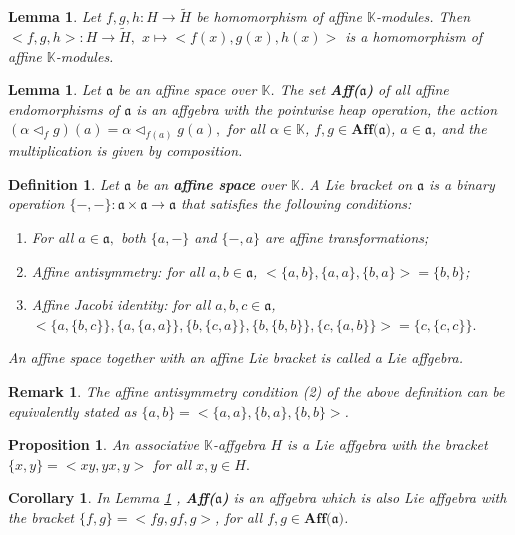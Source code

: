 \documentclass{article}
\newtheorem{remark}{Remark}[section]
\newtheorem{definition}{Definition}[section]
\newtheorem{corollary}{Corollary}[theorem]
\newtheorem{lemma}[theorem]{Lemma}
\newtheorem{proposition}[theorem]{Proposition}
\theoremstyle{definition}
\theoremstyle{remark}
\theoremstyle{plain}
\begin{document}
\begin{lemma}\cite{Brz1}
    Let $f, g, h: H\rightarrow \widetilde{H}$ be homomorphism of affine $\mathbb{K}$-modules. Then $<f, g, h>: H\rightarrow \widetilde{H},$ $x\mapsto <f(x), g(x), h(x)>$ is a homomorphism of affine $\mathbb{K}$-modules.
\end{lemma}
\begin{lemma}\label{0}\cite{Brz1}
     Let $\mathfrak{a}$ be an affine space over $\mathbb{K}$. The set \textbf{Aff($\mathfrak{a}$)} of all affine endomorphisms of $\mathfrak{a}$ is an affgebra with the pointwise heap operation, the action $(\alpha \triangleleft_{f}g)(a)=\alpha \triangleleft_{f(a)}g(a),$ for all $\alpha \in \mathbb{K}$, $f, g \in \textbf{Aff($\mathfrak{a}$)}$, $a\in \mathfrak{a}$, and the multiplication is given by composition.
\end{lemma}

\begin{definition} \cite{And2}
     Let $\mathfrak{a}$ be an \textbf{affine space} over $\mathbb{K}$. A \emph{Lie bracket} on $\mathfrak{a}$ is a binary operation $\{-,-\}:\mathfrak{a} \times \mathfrak{a} \rightarrow \mathfrak{a}$ that satisfies the following conditions:
     \begin{enumerate}
         \item For all $a\in \mathfrak{a},$ both $\{a, -\}$ and $\{-, a\}$ are affine transformations;
         \item Affine antisymmetry: for all $a, b \in \mathfrak{a}$, $<\{a, b\}, \{a, a\}, \{b, a\}>=\{b, b\}$;
         \item Affine Jacobi identity: for all $a, b, c \in \mathfrak{a}$, $<\{a, \{b, c\}\}, \{a, \{a, a\}\}, \{b, \{c,a\}\}, \{b, \{b, b\}\}, \{c, \{a, b\}\}>=\{c, \{c, c\}\}.$
     \end{enumerate}
     An affine space together with an affine Lie bracket is called a Lie affgebra.
 \end{definition}
  \begin{remark}
     The affine antisymmetry condition (2) of the above definition can be equivalently stated as 
     $\{a, b\}=<\{a, a\}, \{b, a\}, \{b, b\}>$.
 \end{remark}
 \begin{proposition}\cite{Brz1}
      An associative $\mathbb{K}$-affgebra $H$ is a Lie affgebra with the bracket $\{x, y\}=<xy, yx, y>$ for all $x, y \in H.$
 \end{proposition}
\begin{corollary}
    In Lemma \ref{0} , \textbf{Aff($\mathfrak{a}$)} is an affgebra which is also Lie affgebra with the bracket $\{f, g\}=<fg, gf, g>$, for all $f, g \in \textbf{Aff($\mathfrak{a}$)}$.
\end{corollary}
\end{document}
